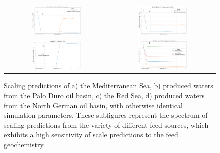 \begin{figure}
    \centering
    \begin{tabular}{c|c}
        \includegraphics[width=0.49\textwidth]{images/ROSSpy/sensitivity_analyses/feed_source/Mediterranean.png} &
        \includegraphics[width=0.49\textwidth]{images/ROSSpy/sensitivity_analyses/feed_source/Palo_Duro_basin.png} \\ \midrule
        \includegraphics[width=0.49\textwidth]{images/ROSSpy/sensitivity_analyses/feed_source/Red_Sea.png} & \includegraphics[width=0.49\textwidth]{images/ROSSpy/sensitivity_analyses/feed_source/German_Basin.png} \\ \bottomrule
    \end{tabular}
    \caption{
        Scaling predictions of a) the Mediterranean Sea, b) produced waters from the Palo Duro oil basin, c) the Red Sea, d) produced waters from the North German oil basin, with otherwise identical simulation parameters. These subfigures represent the spectrum of scaling predictions from the variety of different feed sources, which exhibits a high sensitivity of scale predictions to the feed geochemistry. 
    }
    \label{feed_sources}
\end{figure}

